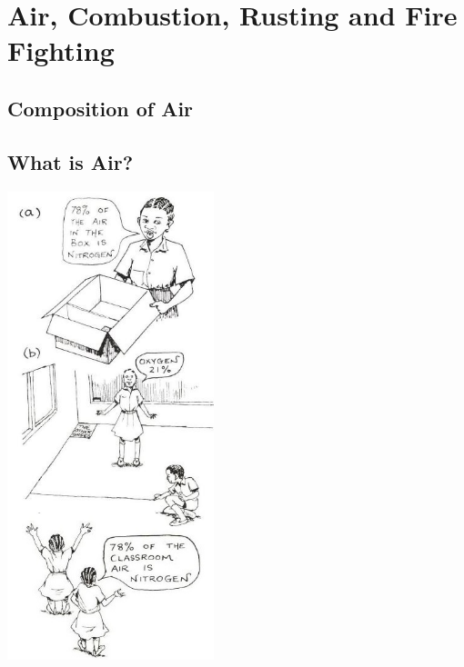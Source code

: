 \section{Air, Combustion, Rusting and Fire Fighting}

\begin{multicols}{2}

\section*{Composition of Air}


\subsection{What is Air?}

\begin{center}
\includegraphics[width=0.45\textwidth]{./img/source/air-comp-1.jpg}
\end{center}


\end{multicols}
